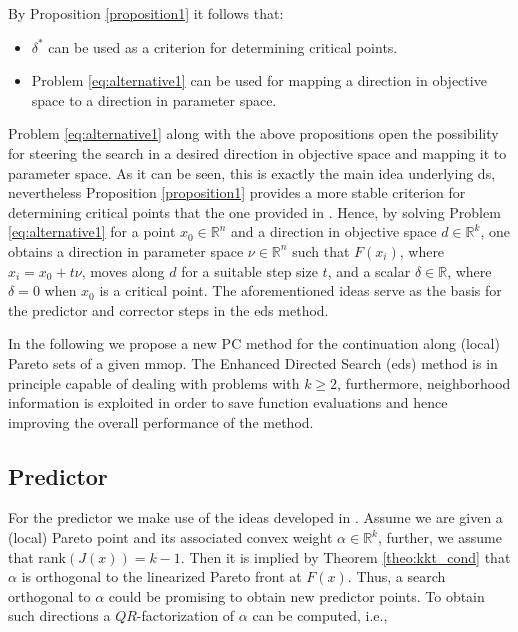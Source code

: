 By Proposition \ref{proposition1} it follows that:

\begin{itemize}
\item $\delta^*$ can be used as a criterion for determining critical points.
\item Problem \eqref{eq:alternative1} can be used for mapping a direction in objective space to a direction in parameter space.
\end{itemize}

Problem \ref{eq:alternative1} along with the above propositions open the possibility for steering the search in a desired direction in objective space and mapping it to parameter space. As it can be seen, this is exactly the main idea underlying \gls{ds}, nevertheless Proposition \ref{proposition1} provides a more stable criterion for determining critical points that the one provided in \cite{directed_search}. Hence, by solving Problem \eqref{eq:alternative1} for a point $x_0 \in \mathbb{R}^n$ and a direction in objective space $d \in \mathbb{R}^k$, one obtains a direction in parameter space $\nu \in \mathbb{R}^n$ such that $F(x_i)$, where $x_i = x_0 + t \nu$, moves along $d$ for a suitable step size $t$, and a scalar $\delta \in \mathbb{R}$, where $\delta = 0$ when $x_0$ is a critical point. The aforementioned ideas serve as the basis for the predictor and corrector steps in the \gls{eds} method.

In the following we propose a new PC method for the continuation along (local) Pareto sets of a given \gls{mmop}. The Enhanced Directed Search (\gls{eds}) method is in principle capable of dealing with problems with $k \geq 2$, furthermore, neighborhood information is exploited in order to save function evaluations and hence improving the overall performance of the method.

\subsection{Predictor}
\label{sec:predictor}

For the predictor we make use of the ideas developed in \cite{directed_search}. Assume we are given a (local) Pareto point and its associated convex weight $\alpha \in \mathbb{R}^k$, further, we assume that rank$(J(x)) = k - 1$. Then it is implied by Theorem \ref{theo:kkt_cond} that $\alpha$ is orthogonal to the linearized Pareto front at $F(x)$. Thus, a search orthogonal to $\alpha$ could be promising to obtain new predictor points. To obtain such directions a $QR$-factorization of $\alpha$ can be computed, i.e.,

